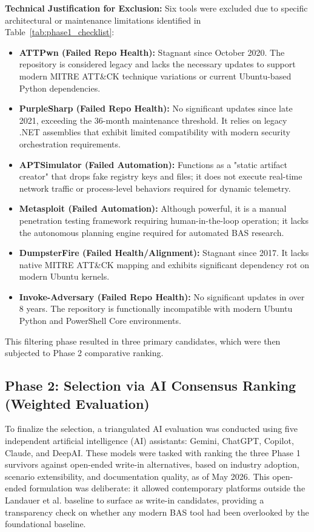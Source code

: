 \noindent \textbf{Technical Justification for Exclusion:}
Six tools were excluded due to specific architectural or maintenance limitations identified in Table~\ref{tab:phase1_checklist}:
\begin{itemize}
    \item \textbf{ATTPwn (Failed Repo Health):} Stagnant since October 2020. The repository is considered legacy and lacks the necessary updates to support modern MITRE ATT\&CK technique variations or current Ubuntu-based Python dependencies.
    \item \textbf{PurpleSharp (Failed Repo Health):} No significant updates since late 2021, exceeding the 36-month maintenance threshold. It relies on legacy .NET assemblies that exhibit limited compatibility with modern security orchestration requirements.
    \item \textbf{APTSimulator (Failed Automation):} Functions as a "static artifact creator" that drops fake registry keys and files; it does not execute real-time network traffic or process-level behaviors required for dynamic telemetry.
    \item \textbf{Metasploit (Failed Automation):} Although powerful, it is a manual penetration testing framework requiring human-in-the-loop operation; it lacks the autonomous planning engine required for automated BAS research.
    \item \textbf{DumpsterFire (Failed Health/Alignment):} Stagnant since 2017. It lacks native MITRE ATT\&CK mapping and exhibits significant dependency rot on modern Ubuntu kernels.
    \item \textbf{Invoke-Adversary (Failed Repo Health):} No significant updates in over 8 years. The repository is functionally incompatible with modern Ubuntu Python and PowerShell Core environments.
\end{itemize}

This filtering phase resulted in three primary candidates, which were then subjected to Phase 2 comparative ranking.

\subsection{Phase 2: Selection via AI Consensus Ranking (Weighted Evaluation)}
To finalize the selection, a triangulated AI evaluation was conducted using five independent artificial intelligence (AI) assistants: Gemini, ChatGPT, Copilot, Claude, and DeepAI. These models were tasked with ranking the three Phase 1 survivors against open-ended write-in alternatives, based on industry adoption, scenario extensibility, and documentation quality, as of May 2026. This open-ended formulation was deliberate: it allowed contemporary platforms outside the Landauer et al. baseline to surface as write-in candidates, providing a transparency check on whether any modern BAS tool had been overlooked by the foundational baseline.

